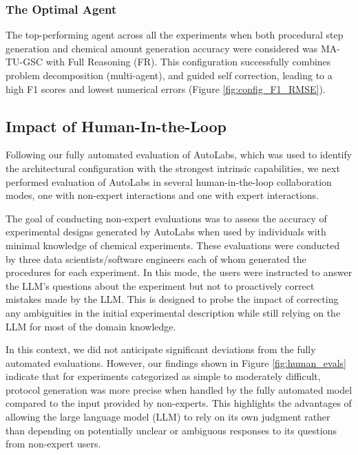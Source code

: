\documentclass[sn-nature, twocolumn]{sn-jnl}%
\theoremstyle{thmstyleone}%
\theoremstyle{thmstyletwo}%
\theoremstyle{thmstylethree}%
\begin{document}
\subsubsection*{The Optimal Agent} 
The top-performing agent across all the experiments when both procedural step generation and chemical amount generation accuracy were considered  was MA-TU-GSC with Full Reasoning (FR). 
This configuration successfully combines problem decomposition (multi-agent), and guided self correction, leading to a high F1 scores and lowest numerical errors (Figure \ref{fig:config_F1_RMSE}).

\subsection{Impact of Human-In-the-Loop}

Following our fully automated evaluation of AutoLabs, which was used to identify the architectural configuration with the strongest intrinsic capabilities, we next performed evaluation of AutoLabs in several human-in-the-loop collaboration modes, one with non-expert interactions and one with expert interactions.

The goal of conducting non-expert evaluations was to assess the accuracy of experimental designs generated by AutoLabs when used by individuals with minimal knowledge of chemical experiments. These evaluations were conducted by three data scientists/software engineers each of whom generated the procedures for each experiment. In this mode, the users were instructed to answer the LLM's questions about the experiment but not to proactively correct mistakes made by the LLM. This is designed to probe the impact of correcting any ambiguities in the initial experimental description while still relying on the LLM for most of the domain knowledge. 

In this context, we did not anticipate significant deviations from the fully automated evaluations. However, our findings shown in Figure \ref{fig:human_evals} indicate that for experiments categorized as simple to moderately difficult, protocol generation was more precise when handled by the fully automated model compared to the input provided by non-experts. This highlights the advantages of allowing the large language model (LLM) to rely on its own judgment rather than depending on potentially unclear or ambiguous responses to its questions from non-expert users. 
\end{document}
